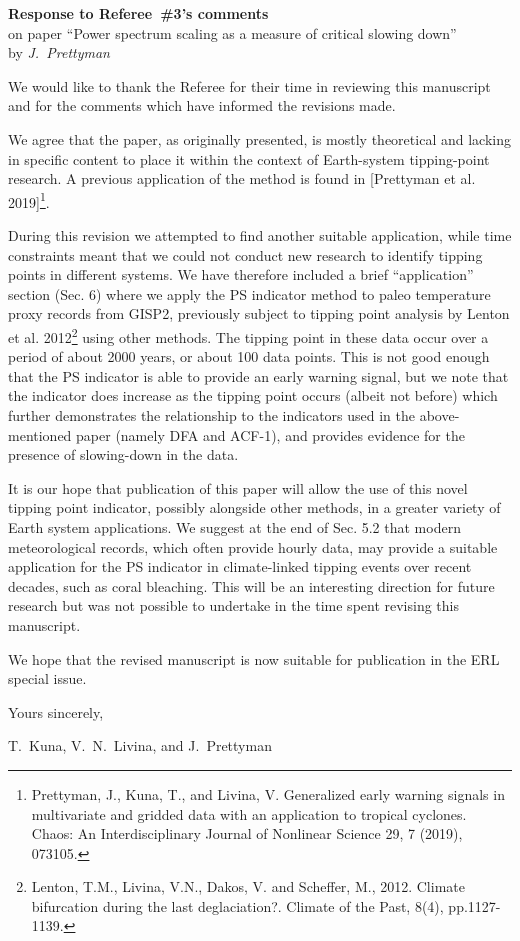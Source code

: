 \documentclass[12pt, a4paper]{article}
\begin{document}
\begin{center}
{\bf Response to Referee~\#3's comments}\\
on paper ``Power spectrum scaling as a measure of critical slowing down''\\[5pt]
by {\it J.~Prettyman}
\end{center}

\vspace{3mm}

\noindent We would like to thank the Referee for their time in reviewing this manuscript and for the comments which have informed the revisions made. 

We agree that the paper, as originally presented, is mostly theoretical and lacking in specific content to place it within the context of Earth-system tipping-point research. A previous application of the method is found in [Prettyman et al. 2019]\footnote{Prettyman, J., Kuna, T., and Livina, V. Generalized early warning signals in multivariate and gridded data with an application to tropical cyclones. Chaos: An Interdisciplinary Journal of Nonlinear Science 29, 7 (2019), 073105.}. 

During this revision we attempted to find another suitable application, while time constraints meant that we could not conduct new research to identify tipping points in different systems. We have therefore included a brief “application” section (Sec. 6) where we apply the PS indicator method to paleo temperature proxy records from GISP2, previously subject to tipping point analysis by Lenton et al. 2012\footnote{‌Lenton, T.M., Livina, V.N., Dakos, V. and Scheffer, M., 2012. Climate bifurcation during the last deglaciation?. Climate of the Past, 8(4), pp.1127-1139.} using other methods. The tipping point in these data occur over a period of about 2000 years, or about 100 data points. This is not good enough that the PS indicator is able to provide an early warning signal, but we note that the indicator does increase as the tipping point occurs (albeit not before) which further demonstrates the relationship to the indicators used in the above-mentioned paper (namely DFA and ACF-1), and provides evidence for the presence of slowing-down in the data.

It is our hope that publication of this paper will allow the use of this novel tipping point indicator, possibly alongside other methods, in a greater variety of Earth system applications. We suggest at the end of Sec. 5.2 that modern meteorological records, which often provide hourly data, may provide a suitable application for the PS indicator in climate-linked tipping events over recent decades, such as coral bleaching. This will be an interesting direction for future research but was not possible to undertake in the time spent revising this manuscript. 


\vspace{7mm}

\noindent
We hope that the revised manuscript is now suitable for publication
in the ERL special issue.

\vspace{5mm}

\noindent
Yours sincerely,

\vspace{1mm}

\noindent
T.~Kuna, V.~N.~Livina, and J.~Prettyman
\end{document}
